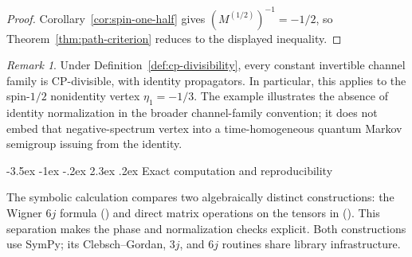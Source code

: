 \documentclass[twoside,10pt]{article}
\makeatletter
\numberwithin{equation}{section}
\theoremstyle{slbody}
\theoremstyle{definition}
\theoremstyle{remark}
\newtheorem{remark}[theorem]{Remark}
\renewcommand{\section}{%
  \@startsection{section}{1}{\z@}%
    {-3.5ex \@plus -1ex \@minus -.2ex}%
    {2.3ex \@plus .2ex}%
    {\normalfont\large\bfseries}}
\renewcommand{\eqref}[1]{%
  \textup{{\normalfont(\oldstylenums{\ref{#1}}}\normalfont)}}
\makeatother
\begin{document}
\begin{proof}
Corollary~\ref{cor:spin-one-half} gives
\((M^{(1/2)})^{-1}=-1/2\), so Theorem~\ref{thm:path-criterion}
reduces to the displayed inequality.
\end{proof}

\begin{remark}
Under Definition~\ref{def:cp-divisibility}, every constant invertible
channel family is CP-divisible, with identity propagators.  In particular,
this applies to the spin-\(1/2\) nonidentity vertex \(\eta_1=-1/3\).  The
example illustrates the absence of identity normalization in the broader
channel-family convention; it does not embed that negative-spectrum vertex
into a time-homogeneous quantum Markov semigroup issuing from the identity.
\end{remark}

\section{Exact computation and reproducibility}

The symbolic calculation compares two algebraically distinct
constructions: the Wigner \(6j\) formula \eqref{eq:M-definition} and
direct matrix operations on the tensors in
\eqref{eq:tensor-definition}.  This separation makes the phase and
normalization checks explicit.  Both constructions use SymPy; its
Clebsch--Gordan, \(3j\), and \(6j\) routines share library infrastructure.
\end{document}

